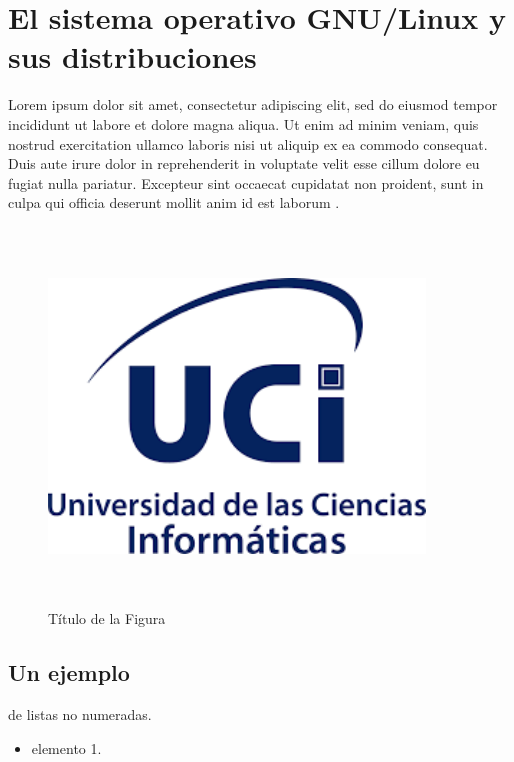 
\chap{\CapUno}

\section{El sistema operativo GNU/Linux y sus distribuciones}
Lorem ipsum dolor sit amet, consectetur adipiscing elit, sed do eiusmod tempor incididunt ut labore et dolore magna aliqua. Ut enim ad minim veniam, quis nostrud exercitation ullamco laboris nisi ut aliquip ex ea commodo consequat. Duis aute irure dolor in reprehenderit in voluptate velit esse cillum dolore eu fugiat nulla pariatur. Excepteur sint occaecat cupidatat non proident, sunt in culpa qui officia deserunt mollit anim id est laborum \cite{noauthor_algo_2019}.

\begin{figure}
	\centering
	\includegraphics[width=10cm,height=10cm]{Figuras/ucilogo.png}
	\caption{Título de la Figura}
\end{figure}

\subsection{Un ejemplo}
de listas no numeradas.

\begin{itemize}
	\item elemento 1.
\end{itemize}

